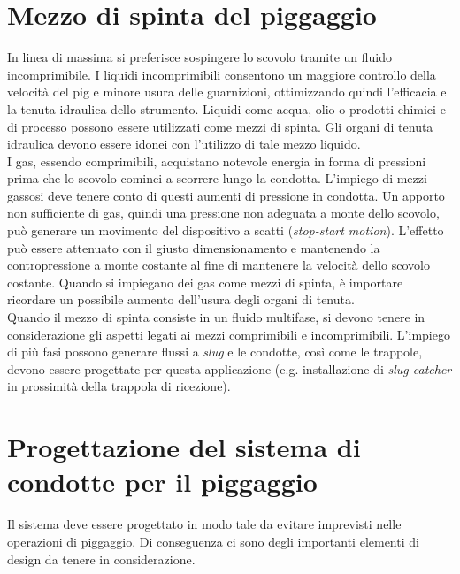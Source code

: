 \section{Mezzo di spinta del piggaggio}
In linea di massima si preferisce sospingere lo scovolo tramite un fluido incomprimibile. I liquidi incomprimibili consentono un maggiore controllo della velocità del pig e minore usura delle guarnizioni, ottimizzando quindi l'efficacia e la tenuta idraulica dello strumento. Liquidi come acqua, olio o prodotti chimici e di processo possono essere utilizzati come mezzi di spinta. Gli organi di tenuta idraulica devono essere idonei con l'utilizzo di tale mezzo liquido.\\
I gas, essendo comprimibili, acquistano notevole energia in forma di pressioni prima che lo scovolo cominci a scorrere lungo la condotta. L'impiego di mezzi gassosi deve tenere conto di questi aumenti di pressione in condotta. Un apporto non sufficiente di gas, quindi una pressione non adeguata a monte dello scovolo,  può generare un movimento del dispositivo a scatti (\textit{stop-start motion}). L'effetto può essere attenuato con il giusto dimensionamento e mantenendo la contropressione a monte costante al fine di mantenere la velocità dello scovolo costante. Quando si impiegano dei gas come mezzi di spinta, è importare ricordare un possibile aumento dell'usura degli organi di tenuta. \\
Quando il mezzo di spinta consiste in un fluido multifase, si devono tenere in considerazione gli aspetti legati ai mezzi comprimibili e incomprimibili. L'impiego di più fasi possono generare flussi a \textit{slug} e le condotte, così come le trappole, devono essere progettate per questa applicazione (e.g. installazione di \textit{slug catcher} in prossimità della trappola di ricezione).


\section{Progettazione del sistema di condotte per il piggaggio}
Il sistema deve essere progettato in modo tale da evitare imprevisti nelle operazioni di piggaggio. Di conseguenza ci sono degli importanti elementi di design da tenere in considerazione.
